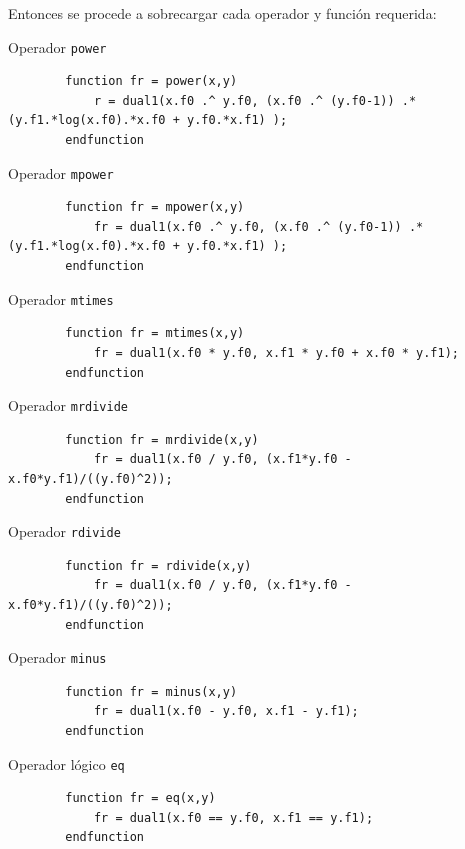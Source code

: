\documentclass[a4paper, 12pt]{article}
\begin{document}
    Entonces se procede a sobrecargar cada operador y función requerida:

    Operador \verb|power|

    \begin{verbatim}
        function fr = power(x,y)
            r = dual1(x.f0 .^ y.f0, (x.f0 .^ (y.f0-1)) .* (y.f1.*log(x.f0).*x.f0 + y.f0.*x.f1) );
        endfunction
    \end{verbatim}

    Operador \verb|mpower|

    \begin{verbatim}
        function fr = mpower(x,y)
            fr = dual1(x.f0 .^ y.f0, (x.f0 .^ (y.f0-1)) .* (y.f1.*log(x.f0).*x.f0 + y.f0.*x.f1) );
        endfunction
    \end{verbatim}

    Operador \verb|mtimes|

    \begin{verbatim}
        function fr = mtimes(x,y)
            fr = dual1(x.f0 * y.f0, x.f1 * y.f0 + x.f0 * y.f1);
        endfunction
    \end{verbatim}

    Operador \verb|mrdivide|

    \begin{verbatim}
        function fr = mrdivide(x,y)
            fr = dual1(x.f0 / y.f0, (x.f1*y.f0 - x.f0*y.f1)/((y.f0)^2));
        endfunction
    \end{verbatim}

    Operador \verb|rdivide|

    \begin{verbatim}
        function fr = rdivide(x,y)
            fr = dual1(x.f0 / y.f0, (x.f1*y.f0 - x.f0*y.f1)/((y.f0)^2));
        endfunction
    \end{verbatim}
    
    Operador \verb|minus|

    \begin{verbatim}
        function fr = minus(x,y)
            fr = dual1(x.f0 - y.f0, x.f1 - y.f1);
        endfunction
    \end{verbatim}

    Operador lógico \verb|eq|

    \begin{verbatim}
        function fr = eq(x,y)
            fr = dual1(x.f0 == y.f0, x.f1 == y.f1);
        endfunction
    \end{verbatim}
\end{document}
